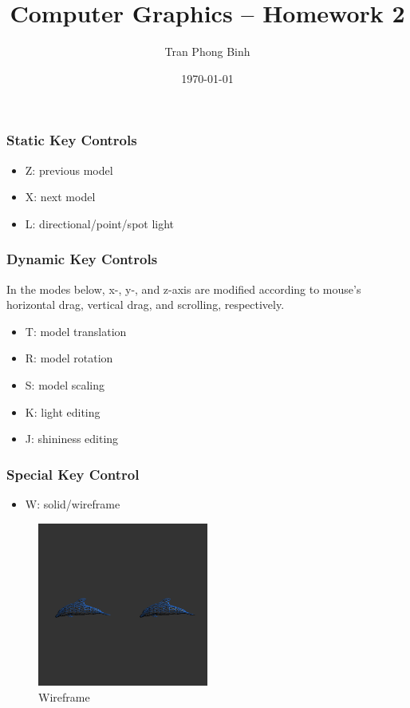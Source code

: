 \documentclass{beamer}
\title{Computer Graphics -- Homework 2}
\author{Tran Phong Binh}
\institute{Student ID: 110062421}
\date{\today}
\begin{document}
\begin{frame}
  \titlepage
\end{frame}

\begin{frame}
  \frametitle{Static Key Controls}
  \begin{itemize}
    \item Z: previous model
    \item X: next model
    \item L: directional/point/spot light
  \end{itemize}
\end{frame}

\begin{frame}
  \frametitle{Dynamic Key Controls}
  In the modes below, x-, y-, and z-axis are modified according to mouse's horizontal drag, vertical drag, and scrolling, respectively.
  \begin{itemize}
    \item T: model translation
    \item R: model rotation
    \item S: model scaling
    \item K: light editing
    \item J: shininess editing
  \end{itemize}
\end{frame}

\begin{frame}
  \frametitle{Special Key Control}
  \begin{itemize}
    \item W: solid/wireframe
  \end{itemize}
  \begin{figure}
    \includegraphics[width=0.5\textwidth]{wireframe}
    \caption{Wireframe}
  \end{figure}
\end{frame}
\end{document}
